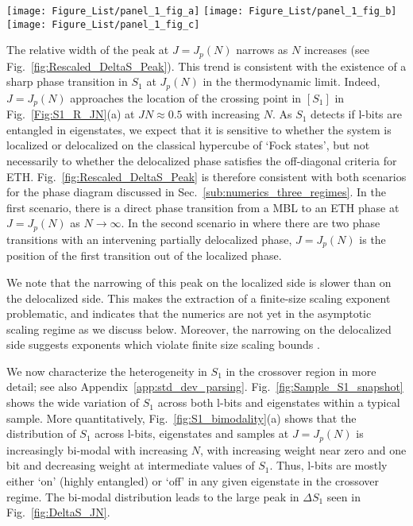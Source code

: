 \documentclass[aps,pra,twocolumn,a4paper,showpacs,superscriptaddress,floatfix,10pt]{revtex4}
\begin{document}
\begin{figure*}[ht]
\texttt{[image: Figure\_List/panel\_1\_fig\_a]}
\texttt{[image: Figure\_List/panel\_1\_fig\_b]}
\texttt{[image: Figure\_List/panel\_1\_fig\_c]}
\caption{
 (a) Histogram of $S_1$ collected across l-bits, states and samples at $J_p$. (b) Standard deviation of $S_1^i$ for a fixed l-bit $i$ among eigenstates from the same sample and averaged over different samples $\left[\Delta_E S_1^{i}\right]_{s}$ vs scaled $J$.  (c) Standard deviation over samples of $S_1$ averaged within each sample over eigenstates and l-bits vs scaled $J$.}
\label{fig:S1_bimodality}
\end{figure*}

The relative width of the peak at $J=J_p(N)$ narrows as $N$ increases (see Fig.~\ref{fig:Rescaled_DeltaS_Peak}).
This trend is consistent with the existence of a sharp phase transition in $S_1$ at $J_p(N)$ in the thermodynamic limit.
Indeed, $J=J_p(N)$ approaches the location of the crossing point in $[S_1]$ in Fig.~\ref{Fig:S1_R_JN}(a) at $JN\approx 0.5$ with increasing $N$.
As $S_1$ detects if l-bits are entangled in eigenstates, we expect that it is sensitive to whether the system is localized or delocalized on the classical hypercube of `Fock states', but not necessarily to whether the delocalized phase satisfies the off-diagonal criteria for ETH.
Fig.~\ref{fig:Rescaled_DeltaS_Peak} is therefore consistent with both scenarios for the phase diagram discussed in Sec.~\ref{sub:numerics_three_regimes}.
In the first scenario, there is a direct phase transition from a MBL to an ETH phase at $J=J_p(N)$ as $N \to \infty$.
In the second scenario in where there are two phase transitions with an intervening partially delocalized phase, $J = J_p(N)$ is the position of the first transition out of the localized phase.

We note that the narrowing of this peak on the localized side is slower than on the delocalized side.
This makes the extraction of a finite-size scaling exponent problematic, and indicates that the numerics are not yet in the asymptotic scaling regime as we discuss below.
Moreover, the narrowing on the delocalized side suggests exponents which violate finite size scaling bounds \cite{Chayes:1986kq,Chandran:2015aa}.

We now characterize the heterogeneity in $S_1$ in the crossover region in more detail; see also Appendix~\ref{app:std_dev_parsing}.
Fig.~\ref{fig:Sample_S1_snapshot} shows the wide variation of $S_1$ across both l-bits and eigenstates within a typical sample.
More quantitatively, Fig.~\ref{fig:S1_bimodality}(a) shows that the distribution of $S_1$ across l-bits, eigenstates and samples at $J=J_p(N)$ is increasingly bi-modal with increasing $N$, with increasing weight near zero and one bit and decreasing weight at intermediate values of $S_1$.
Thus, l-bits are mostly either `on' (highly entangled) or `off' in any given eigenstate in the crossover regime.
The bi-modal distribution leads to the large peak in $\Delta S_1$ seen in Fig.~\ref{fig:DeltaS_JN}.
\end{document}
